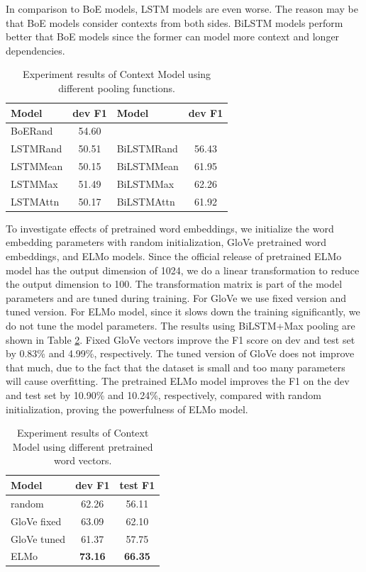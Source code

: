\documentclass[letterpaper]{article} %
\begin{document}
In comparison to BoE models, LSTM models are even worse. The reason may be that BoE models consider contexts from both sides. BiLSTM models perform better that BoE models since the former can model more context and longer dependencies.

\begin{table}[t!]
\centering
\begin{tabular}{l c | l c}
\hline 
{\bf Model} & {\bf dev F1 } & {\bf Model} & {\bf dev F1} \\ 
\hline\hline
BoERand & 54.60 && \\
\hline
LSTMRand & 50.51 & BiLSTMRand & 56.43 \\
LSTMMean & 50.15 & BiLSTMMean & 61.95 \\
LSTMMax & 51.49 & BiLSTMMax  & 62.26 \\
LSTMAttn & 50.17 & BiLSTMAttn & 61.92 \\ 
\hline
\end{tabular}
\caption{Experiment results of Context Model using different pooling functions.}
\label{table:contextresult}
\end{table}

To investigate effects of pretrained word embeddings, we initialize the word embedding parameters with random initialization, GloVe pretrained word embeddings, and ELMo models. Since the official release of pretrained ELMo model has the output dimension of 1024, we do a linear transformation to reduce the output dimension to 100. The transformation matrix is part of the model parameters and are tuned during training. For GloVe we use fixed version and tuned version. For ELMo model, since it slows down the training significantly, we do not tune the model parameters. The results using BiLSTM+Max pooling are shown in Table \ref{table:pretrain}. Fixed GloVe vectors improve the F1 score on dev and test set by 0.83\% and 4.99\%, respectively. The tuned version of GloVe does not improve that much, due to the fact that the dataset is small and too many parameters will cause overfitting. The pretrained ELMo model improves the F1 on the dev and test set by 10.90\% and 10.24\%, respectively, compared with random initialization, proving the powerfulness of ELMo model.

\begin{table}[t]
\centering
\begin{tabular}{l c c} 
\hline
{\bf Model}  & {\bf dev F1 } & {\bf test F1 } \\
\hline\hline
random  &  62.26  & 56.11 \\ 
GloVe fixed  & 63.09  & 62.10 \\
GloVe tuned  & 61.37  & 57.75  \\
ELMo  & {\bf 73.16} & {\bf 66.35} \\
\hline
\end{tabular}
\caption{Experiment results of Context Model using different pretrained word vectors.}
\label{table:pretrain}
\end{table}
\end{document}

